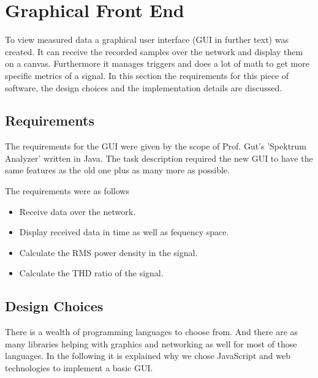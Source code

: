 %
%

\chapter{Graphical Front End} %
\label{ch:graphical_front_end}

To view measured data a graphical user interface (GUI in further text) was created. It can receive the recorded samples over the network and display them on a canvas. Furthermore it manages triggers and does a lot of math to get more specific metrics of a signal.
In this section the requirements for this piece of software, the design choices and the implementation details are discussed.

\section{Requirements}

The requirements for the GUI were given by the scope of Prof. Gut's 'Spektrum Analyzer' written in Java.
The task description required the new GUI to have the same features as the old one plus as many more as possible.

The requirements were as follows

\begin{itemize}
    \item Receive data over the network.
    \item Display received data in time as well as fequency space.
    \item Calculate the RMS power density in the signal.
    \item Calculate the THD ratio of the signal.
\end{itemize}

%
%

\section{Design Choices}

There is a wealth of programming languages to choose from. And there are as many libraries helping with graphics and networking as well for most of those languages.
In the following it is explained why we chose JavaScript and web technologies to implement a basic GUI.

